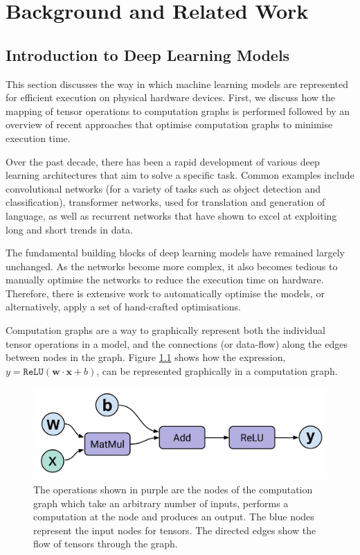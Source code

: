 \chapter{Background and Related Work}

\section{Introduction to Deep Learning Models}
This section discusses the way in which machine learning models are represented for efficient execution on physical hardware devices. First, we discuss how the mapping of tensor operations to computation graphs is performed followed by an overview of recent approaches that optimise computation graphs to minimise execution time.

Over the past decade, there has been a rapid development of various deep learning architectures that aim to solve a specific task. Common examples include convolutional networks (for a variety of tasks such as object detection and classification), transformer networks, used for translation and generation of language, as well as recurrent networks that have shown to excel at exploiting long and short trends in data.

The fundamental building blocks of deep learning models have remained largely unchanged.  As the networks become more complex, it also becomes tedious to manually optimise the networks to reduce the execution time on hardware. Therefore, there is extensive work to automatically optimise the models, or alternatively, apply a set of hand-crafted optimisations.

Computation graphs are a way to graphically represent both the individual tensor operations in a model, and the connections (or data-flow) along the edges between nodes in the graph. Figure \ref{fig:bg:perceptron} shows how the expression, $y = \texttt{ReLU}(\mathbf{w} \cdot \mathbf{x} + b)$, can be represented graphically in a computation graph.

\begin{figure}[ht]
  \centering
  \includegraphics[width=0.75\columnwidth]{sections/2background/images/dataflow}
  \caption[Single perceptron as a computation graph]{The operations shown in purple are the nodes of the computation graph which take an arbitrary number of inputs, performs a computation at the node and produces an output. The blue nodes represent the input nodes for tensors. The directed edges show the flow of tensors through the graph.}
  \label{fig:bg:perceptron}
\end{figure}

